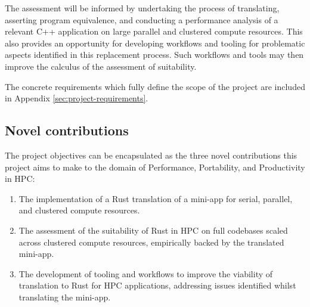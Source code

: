 The assessment will be informed by undertaking the process of translating, asserting program equivalence, and conducting a performance analysis of a relevant C++ application on large parallel and clustered compute resources. This also provides an opportunity for developing workflows and tooling for problematic aspects identified in this replacement process. Such workflows and tools may then improve the calculus of the assessment of suitability.

The concrete requirements which fully define the scope of the project are included in Appendix \ref{sec:project-requirements}.

\subsection{Novel contributions}
\label{ssec:objectives-novel-contributions}

The project objectives can be encapsulated as the three novel contributions this project aims to make to the domain of Performance, Portability, and Productivity in \acrshort{HPC}:

\begin{enumerate}
    \item The implementation of a Rust translation of a \acrshort{mini-app} for serial, parallel, and clustered compute resources.
    \item The assessment of the suitability of Rust in HPC on full codebases scaled across clustered compute resources, empirically backed by the translated \acrshort{mini-app}.
    \item The development of tooling and workflows to improve the viability of translation to Rust for HPC applications, addressing issues identified whilst translating the \acrshort{mini-app}.
\end{enumerate}
